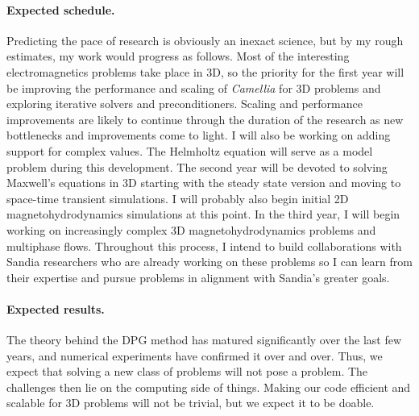 \documentclass[letterpaper,12pt]{article}
\begin{document}
\paragraph{Expected schedule.}
Predicting the pace of research is obviously an inexact science, but by my rough estimates, my work would progress as follows.
Most of the interesting electromagnetics problems take place in 3D, so the priority for the first year will 
be improving the performance and scaling of \emph{Camellia} for 3D problems and exploring iterative solvers and preconditioners.
Scaling and performance improvements are likely to continue through the duration of the research as new bottlenecks and improvements come to light.
I will also be working on adding support for complex values. The Helmholtz equation will serve as a model problem during this development.
The second year will be devoted to solving Maxwell's equations in 3D starting with the steady state version and moving to space-time transient simulations.
I will probably also begin initial 2D magnetohydrodynamics simulations at this point.
In the third year, I will begin working on increasingly complex 3D magnetohydrodynamics problems and multiphase flows.
Throughout this process, I intend to build collaborations with Sandia researchers who are already working on these problems so I can 
learn from their expertise and pursue problems in alignment with Sandia's greater goals.

\paragraph{Expected results.}
The theory behind the DPG method has matured significantly over the last few years, and numerical experiments have confirmed it over and over.
Thus, we expect that solving a new class of problems will not pose a problem.
The challenges then lie on the computing side of things. 
Making our code efficient and scalable for 3D problems will not be trivial, but we expect it to be doable.


 

\end{document}
